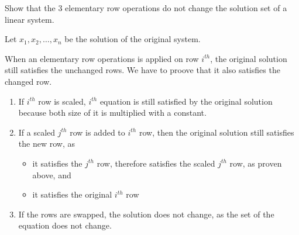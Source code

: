 \documentclass[../../../../Assignments]{subfiles}
\begin{document}
\begin{exercise}
    Show that the 3 elementary row operations do not change the solution set of
    a linear system.
\end{exercise}

\begin{solution}
    Let \(x_1, x_2, \ldots, x_n\) be the solution of the original system.

    When an elementary row operations is applied on row \(i^{th}\), the original
    solution still satisfies the unchanged rows. We have to proove that it also
    satisfies the changed row.

    \begin{enumerate}[label = \alph*)]
        \item If \(i^{th}\) row is scaled, \(i^{th}\) equation is still
            satisfied by the original solution because both size of it is
            multiplied with a constant.

        \item If a scaled \(j^{th}\) row is added to \(i^{th}\) row, then the
            original solution still satisfies the new row, as
            \begin{itemize}
                \item it satisfies the \(j^{th}\) row, therefore satisfies the
                    scaled \(j^{th}\) row, as proven above, and
                \item it satisfies the original \(i^{th}\) row
            \end{itemize}

        \item If the rows are swapped, the solution does not change, as the set
            of the equation does not change.
    \end{enumerate}
\end{solution}
\end{document}
